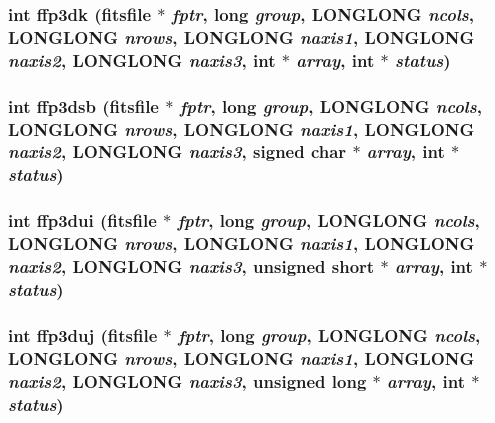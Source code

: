 \subsubsection{\setlength{\rightskip}{0pt plus 5cm}int ffp3dk (\bf{fitsfile} $\ast$ {\em fptr}, long {\em group}, \bf{LONGLONG} {\em ncols}, \bf{LONGLONG} {\em nrows}, \bf{LONGLONG} {\em naxis1}, \bf{LONGLONG} {\em naxis2}, \bf{LONGLONG} {\em naxis3}, int $\ast$ {\em array}, int $\ast$ {\em status})}\label{fitsio__64_8h_e695cca6e553d21f86ee71051783c338}


\subsubsection{\setlength{\rightskip}{0pt plus 5cm}int ffp3dsb (\bf{fitsfile} $\ast$ {\em fptr}, long {\em group}, \bf{LONGLONG} {\em ncols}, \bf{LONGLONG} {\em nrows}, \bf{LONGLONG} {\em naxis1}, \bf{LONGLONG} {\em naxis2}, \bf{LONGLONG} {\em naxis3}, signed char $\ast$ {\em array}, int $\ast$ {\em status})}\label{fitsio__64_8h_0f9d96f6b290622b85f3dca6c11ea791}


\subsubsection{\setlength{\rightskip}{0pt plus 5cm}int ffp3dui (\bf{fitsfile} $\ast$ {\em fptr}, long {\em group}, \bf{LONGLONG} {\em ncols}, \bf{LONGLONG} {\em nrows}, \bf{LONGLONG} {\em naxis1}, \bf{LONGLONG} {\em naxis2}, \bf{LONGLONG} {\em naxis3}, unsigned short $\ast$ {\em array}, int $\ast$ {\em status})}\label{fitsio__64_8h_1dd3e0662151506b0470d7348493663d}


\subsubsection{\setlength{\rightskip}{0pt plus 5cm}int ffp3duj (\bf{fitsfile} $\ast$ {\em fptr}, long {\em group}, \bf{LONGLONG} {\em ncols}, \bf{LONGLONG} {\em nrows}, \bf{LONGLONG} {\em naxis1}, \bf{LONGLONG} {\em naxis2}, \bf{LONGLONG} {\em naxis3}, unsigned long $\ast$ {\em array}, int $\ast$ {\em status})}\label{fitsio__64_8h_1e610ca12d1921d2b12d1f51184ec1fb}


